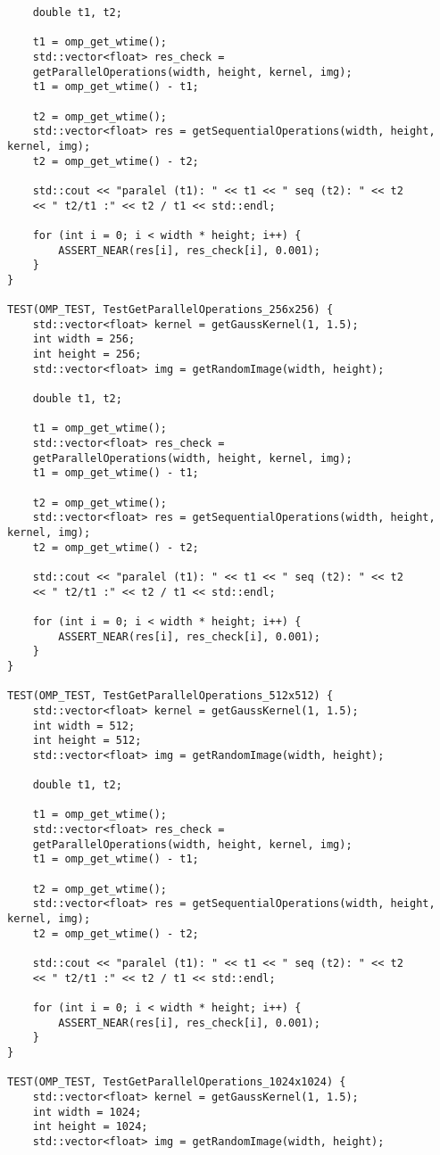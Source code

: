 \documentclass{report}
\begin{document}
\begin{lstlisting}
	double t1, t2;
	
	t1 = omp_get_wtime();
	std::vector<float> res_check =
	getParallelOperations(width, height, kernel, img);
	t1 = omp_get_wtime() - t1;
	
	t2 = omp_get_wtime();
	std::vector<float> res = getSequentialOperations(width, height, kernel, img);
	t2 = omp_get_wtime() - t2;
	
	std::cout << "paralel (t1): " << t1 << " seq (t2): " << t2
	<< " t2/t1 :" << t2 / t1 << std::endl;
	
	for (int i = 0; i < width * height; i++) {
		ASSERT_NEAR(res[i], res_check[i], 0.001);
	}
}

TEST(OMP_TEST, TestGetParallelOperations_256x256) {
	std::vector<float> kernel = getGaussKernel(1, 1.5);
	int width = 256;
	int height = 256;
	std::vector<float> img = getRandomImage(width, height);
	
	double t1, t2;
	
	t1 = omp_get_wtime();
	std::vector<float> res_check =
	getParallelOperations(width, height, kernel, img);
	t1 = omp_get_wtime() - t1;
	
	t2 = omp_get_wtime();
	std::vector<float> res = getSequentialOperations(width, height, kernel, img);
	t2 = omp_get_wtime() - t2;
	
	std::cout << "paralel (t1): " << t1 << " seq (t2): " << t2
	<< " t2/t1 :" << t2 / t1 << std::endl;
	
	for (int i = 0; i < width * height; i++) {
		ASSERT_NEAR(res[i], res_check[i], 0.001);
	}
}

TEST(OMP_TEST, TestGetParallelOperations_512x512) {
	std::vector<float> kernel = getGaussKernel(1, 1.5);
	int width = 512;
	int height = 512;
	std::vector<float> img = getRandomImage(width, height);
	
	double t1, t2;
	
	t1 = omp_get_wtime();
	std::vector<float> res_check =
	getParallelOperations(width, height, kernel, img);
	t1 = omp_get_wtime() - t1;
	
	t2 = omp_get_wtime();
	std::vector<float> res = getSequentialOperations(width, height, kernel, img);
	t2 = omp_get_wtime() - t2;
	
	std::cout << "paralel (t1): " << t1 << " seq (t2): " << t2
	<< " t2/t1 :" << t2 / t1 << std::endl;
	
	for (int i = 0; i < width * height; i++) {
		ASSERT_NEAR(res[i], res_check[i], 0.001);
	}
}

TEST(OMP_TEST, TestGetParallelOperations_1024x1024) {
	std::vector<float> kernel = getGaussKernel(1, 1.5);
	int width = 1024;
	int height = 1024;
	std::vector<float> img = getRandomImage(width, height);
	

\end{lstlisting}
\end{document}
